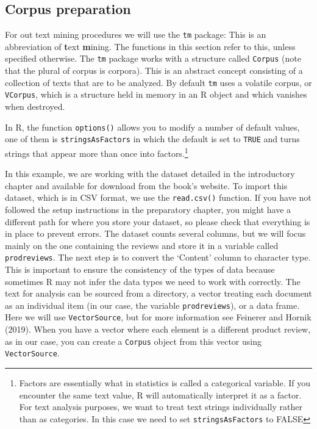 \subsection{Corpus preparation}\label{corpus-preparation}

For out text mining procedures we will use the \texttt{tm} package: This is an abbreviation of \textbf{t}ext \textbf{m}ining. The functions in
this section refer to this, unless specified otherwise. The
\texttt{tm} package works with a structure called \texttt{Corpus} (note that the plural of corpus is corpora). This is an
abstract concept consisting of a collection of texts that are to be
analyzed. By default \texttt{tm} uses a volatile corpus, or
\texttt{VCorpus}, which is a structure held in memory in an R object
and which vanishes when destroyed.

In R, the function \texttt{options()} allows you to modify a number of default
values, one of them is \texttt{stringsAsFactors} in which the default is set
to \texttt{TRUE} and turns strings that appear more than once into
factors.\footnote{Factors are essentially what in statistics is called a
  categorical variable. If you encounter the same text value, R will
  automatically interpret it as a factor. For text analysis purposes, we
  want to treat text strings individually rather than as categories. In
  this case we need to set \texttt{stringsAsFactors} to FALSE}

In this example, we are working with the dataset detailed in the
introductory chapter and available for download from the book's website.
To import this dataset, which is in CSV format, we use the
\texttt{read.csv()} function. If you have not followed the setup
instructions in the preparatory chapter, you might have a different path
for where you store your dataset, so please check that everything is in
place to prevent errors. The dataset counts several columns, but we will
focus mainly on the one containing the reviews and store it
in a variable called \texttt{prodreviews}. The next step is to convert the
`Content' column to character type. This is important to ensure the consistency of the types of data
because sometimes R may not infer the data
types we need to work with correctly. The text for analysis can be sourced from a
directory, a vector treating each document as an individual item (in our
case, the variable \texttt{prodreviews}), or a data frame. Here we will
use \texttt{VectorSource}, but for more information see Feinerer and
Hornik (2019). When you have a vector where each element is a different
product review, as in our case, you can create a \texttt{Corpus}
object from this vector using \texttt{VectorSource}.

